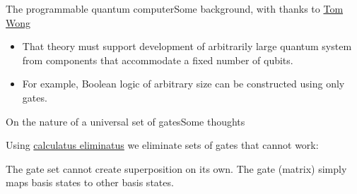 \begin{frame}{The programmable quantum computer}{Some background, with thanks to \href{http://www.thomaswong.net/}{Tom Wong} }
{\begin{itemize}
    \item<11-> That theory must support development of arbitrarily large quantum system from components that accommodate a fixed number of qubits.
    \item<12-> For example, Boolean logic of arbitrary size can be constructed using only  gates.
\end{itemize}}
\end{frame}

\begin{frame}{On the nature of a universal set of gates}{Some thoughts }

Using \href{https://www.youtube.com/watch?v=LVIaZSYLwtE}{calculatus eliminatus} we eliminate sets of gates that cannot work:
\begin{description}
\item<1->[no superposition]  The gate set  cannot create superposition on its own.  The gate (matrix) simply maps basis states to other basis states. 

\end{description}

\end{frame}

